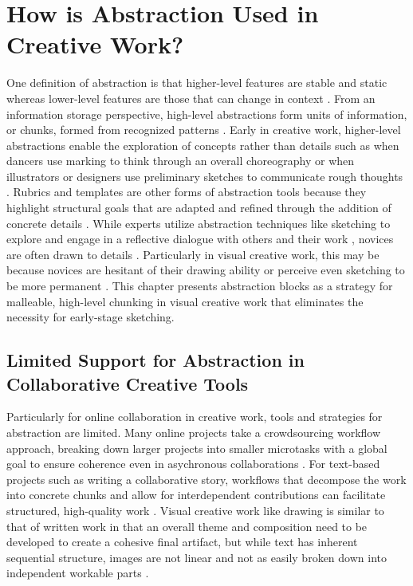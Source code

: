 \section{How is Abstraction Used in Creative Work?}

One definition of abstraction is that higher-level features are stable and static whereas lower-level features are those that can change in context \cite{shapira2012levels}. From an information storage perspective, high-level abstractions form units of information, or chunks, formed from recognized patterns \cite{Chase1973,Gobet2001,Gobet1998}. Early in creative work, higher-level abstractions enable the exploration of concepts rather than details such as when dancers use marking to think through an overall choreography \cite{kirsh2011marking} or when illustrators or designers use preliminary sketches to communicate rough thoughts \cite{Buxton2007, landay1996sketching, Tversky2011,Tversky2009}. Rubrics and templates are other forms of abstraction tools because they highlight structural goals that are adapted and refined through the addition of concrete details \cite{andrade2005teaching,yuan2016}. While experts utilize abstraction techniques like sketching to explore and engage in a reflective dialogue with others and their work \cite{schon1984reflective,Tversky1999,Tversky2009}, novices are often drawn to details \cite{jansson1991design,marsh1996examples,Smith1993}. Particularly in visual creative work, this may be because novices are hesitant of their drawing ability or perceive even sketching to be more permanent \cite{Hennessey,welch2000sketching}. This chapter presents abstraction blocks as a strategy for malleable, high-level chunking in visual creative work that eliminates the necessity for early-stage sketching. 

\subsection{Limited Support for Abstraction in Collaborative Creative Tools}
Particularly for online collaboration in creative work, tools and strategies for abstraction are limited. Many online projects take a crowdsourcing workflow approach, breaking down larger projects into smaller microtasks with a global goal to ensure coherence even in asychronous collaborations \cite{Hahn2016}. For text-based projects such as writing a collaborative story, workflows that decompose the work into concrete chunks and allow for interdependent contributions can facilitate structured, high-quality work \cite{Kim2016,Kim2017,Retelny2014,Salehi2018,Valentine2017}. Visual creative work like drawing is similar to that of written work in that an overall theme and composition need to be developed to create a cohesive final artifact, but while text has inherent sequential structure, images are not linear and not as easily broken down into independent workable parts \cite{Johnson-Laird1983}. 

